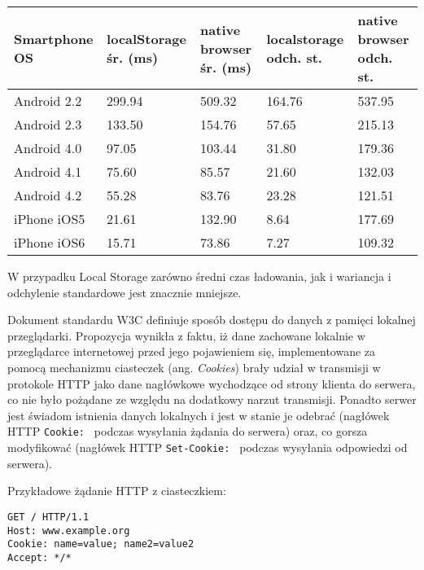 \begin{center}
    \begin{tabular}{ | l | p{2.5cm} | p{2.5cm} | p{2.5cm} | p{2.5cm} |}
    \hline
	Smartphone OS & localStorage \newline śr. (ms) & native browser \newline śr. (ms) & localstorage \newline odch. st. & native browser \newline odch. st. \\ \hline
	Android 2.2 & 299.94 & 509.32 & 164.76 & 537.95 \\ \hline
	Android 2.3 & 133.50 & 154.76 & 57.65 & 215.13 \\ \hline
	Android 4.0 & 97.05 & 103.44 & 31.80 & 179.36 \\ \hline
	Android 4.1 & 75.60 & 85.57 & 21.60 & 132.03 \\ \hline
	Android 4.2 & 55.28 & 83.76 & 23.28 & 121.51 \\ \hline
	iPhone iOS5 & 21.61 & 132.90 & 8.64 & 177.69 \\ \hline
	iPhone iOS6 & 15.71 & 73.86 & 7.27 & 109.32 \\ \hline
    \hline
    \end{tabular}
\end{center}

W przypadku Local Storage zarówno średni czas ładowania, jak i wariancja i odchylenie standardowe jest znacznie mniejsze.

Dokument standardu W3C\cite{webstorage} definiuje sposób dostępu do danych z pamięci lokalnej przeglądarki. Propozycja wynikła z faktu, iż dane zachowane lokalnie w przeglądarce internetowej przed jego pojawieniem się, implementowane za pomocą mechanizmu ciasteczek (ang. \emph{Cookies}) brały udział w transmisji w protokole HTTP jako dane nagłówkowe wychodzące od strony klienta do serwera, co nie było pożądane ze względu na dodatkowy narzut transmisji. Ponadto serwer jest świadom istnienia danych lokalnych i jest w stanie je odebrać (nagłówek HTTP \lstinline{Cookie: } podczas wysyłania żądania do serwera) oraz, co gorsza modyfikować (nagłówek HTTP \lstinline{Set-Cookie: } podczas wysyłania odpowiedzi od serwera).

Przykładowe żądanie HTTP z ciasteczkiem:
\lstset{language=Octave}
\begin{lstlisting}
GET / HTTP/1.1
Host: www.example.org
Cookie: name=value; name2=value2
Accept: */*
\end{lstlisting}

